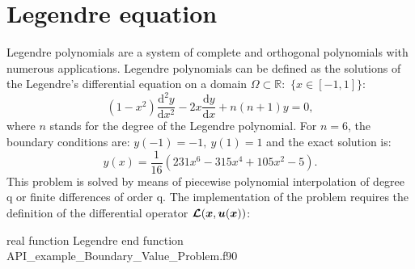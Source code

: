        
\newpage
\section{Legendre equation}
       Legendre polynomials are a system of complete and orthogonal polynomials with numerous applications.
              Legendre polynomials can be defined as the solutions of the Legendre's differential equation on a domain $\Omega \subset 
              \mathbb{R} : $ $\{x\in  [-1,1]\}$:
              \begin{equation*}      	
              (1 - x^2) \frac{\text{d}^2 y}{\text{d} x^2} - 2x \frac{\text{d} y}{\text{d} x} + n (n + 1) y = 0,
              \end{equation*}
              where $ n $ stands for the degree of the Legendre polynomial. 
              For $n = 6$,  the boundary conditions are: $y(-1) = - 1, \  y(1) = 1$ and the exact solution  is:
              \begin{equation*}
              	y(x) = \frac{1}{16}( 231 x^6 - 315 x^4 + 105 x^2 - 5).
              \end{equation*}
              This problem is solved by means of piecewise polynomial interpolation of degree q or finite differences of order q.  The 
              implementation of the problem requires the definition of the differential operator $\boldsymbol{\mathcal{L}} 
              (\boldsymbol{x},\boldsymbol{u}(\boldsymbol{x}))$:
              
              \vspace{0.5cm} 
              {real function Legendre}
              {end function}
              {API_example_Boundary_Value_Problem.f90}
                    
